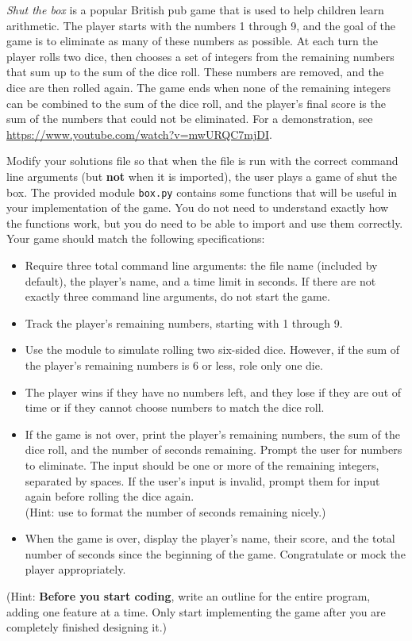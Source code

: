 \begin{problem} %
\emph{Shut the box} is a popular British pub game that is used to help children learn arithmetic.
The player starts with the numbers 1 through 9, and the goal of the game is to eliminate as many of these numbers as possible.
At each turn the player rolls two dice, then chooses a set of integers from the remaining numbers that sum up to the sum of the dice roll.
These numbers are removed, and the dice are then rolled again.
The game ends when none of the remaining integers can be combined to the sum of the dice roll, and the player's final score is the sum of the numbers that could not be eliminated.
For a demonstration, see \url{https://www.youtube.com/watch?v=mwURQC7mjDI}.

Modify your solutions file so that when the file is run with the correct command line arguments (but \textbf{not} when it is imported), the user plays a game of shut the box.
The provided module \texttt{box.py} contains some functions that will be useful in your implementation of the game.
You do not need to understand exactly how the functions work, but you do need to be able to import and use them correctly.
Your game should match the following specifications:

\begin{itemize}
\item Require three total command line arguments: the file name (included by default), the player's name, and a time limit in seconds.
If there are not exactly three command line arguments, do not start the game.
\item Track the player's remaining numbers, starting with 1 through 9.
\item Use the  module to simulate rolling two six-sided dice.
However, if the sum of the player's remaining numbers is 6 or less, role only one die.
\item The player wins if they have no numbers left, and they lose if they are out of time or if they cannot choose numbers to match the dice roll.
\item If the game is not over, print the player's remaining numbers, the sum of the dice roll, and the number of seconds remaining.
Prompt the user for numbers to eliminate.
The input should be one or more of the remaining integers, separated by spaces.
If the user's input is invalid, prompt them for input again before rolling the dice again.
\\(Hint: use  to format the number of seconds remaining nicely.)
\item When the game is over, display the player's name, their score, and the total number of seconds since the beginning of the game.
Congratulate or mock the player appropriately.
\end{itemize}
(Hint: \textbf{Before you start coding}, write an outline for the entire program, adding one feature at a time.
Only start implementing the game after you are completely finished designing it.)


\end{problem}
